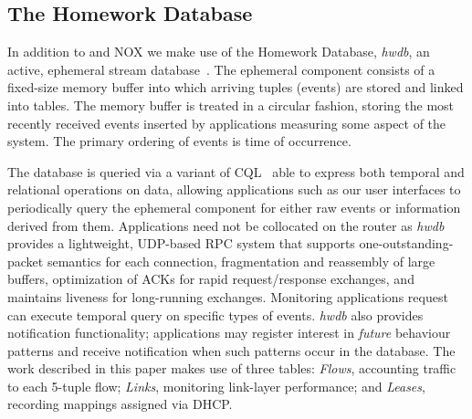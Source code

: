 \subsection{The Homework Database} \label{s:hwdb}
 
 
In addition to \ovs and NOX we make use of the Homework Database,
\emph{hwdb}, an active, ephemeral stream
database~\cite{sventek11:_infor_plane_archit_suppor_home_networ_manag}.  The
ephemeral component consists of a fixed-size memory buffer into which arriving
tuples (events) are stored and linked into tables.  The memory buffer is treated
in a circular fashion, storing the most recently received events inserted by
applications measuring some aspect of the system.  The primary ordering of
events is time of occurrence.  

The database is queried via a variant of CQL~\cite{arasu05:_cql} able to express
both temporal and relational operations on data, allowing applications such as
our user interfaces to periodically query the ephemeral component for either raw
events or information derived from them. 
Applications need not be collocated on the router as \emph{hwdb} provides a
lightweight, UDP-based RPC system that supports one-outstanding-packet semantics
for each connection, fragmentation and reassembly of large buffers, optimization
of ACKs for rapid request/response exchanges, and maintains liveness for
long-running exchanges.  Monitoring applications request can execute temporal
query on specific types of events.  \emph{hwdb} also provides notification
functionality; applications may register interest in \emph{future} behaviour
patterns and receive notification when such patterns occur in the
database.  The work described in this paper makes use of three tables:
\emph{Flows}, accounting traffic to each 5-tuple flow; \emph{Links}, monitoring
link-layer performance; and \emph{Leases}, recording mappings assigned via DHCP.


